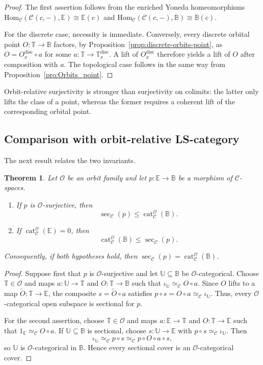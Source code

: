 \documentclass[12pt]{amsart}
\newtheorem{thm}[teo]{Theorem}
\theoremstyle{definition}
\theoremstyle{remark}
\numberwithin{figure}{section}%
\newcommand{\CC}{\mathcal{C}}
\newcommand{\cat}{\mathop{\mathrm{cat}}}
\newcommand{\T}{\mathbb{T}}
\newcommand{\Hom}{\mathrm{Hom}}
\newcommand{\Ee}{\mathbb{E}}
\newcommand{\Bb}{\mathbb{B}}
\newcommand{\Uu}{\mathbb{U}}
\begin{document}
\begin{proof}
The first assertion follows from the enriched Yoneda homeomorphisms
$\Hom_{\CC}(\CC(c,-),\Ee)\cong\Ee(c)$ and
$\Hom_{\CC}(\CC(c,-),\Bb)\cong\Bb(c)$.

For the discrete case, necessity is immediate. Conversely, every
discrete orbital point $O\colon\T\to\Bb$ factors, by
Proposition~\ref{prop:discrete-orbits-point}, as
$O=O_x^{\mathrm{disc}}\circ a$ for some
$a\colon\T\to\T_x^{\mathrm{disc}}$. A lift of
$O_x^{\mathrm{disc}}$ therefore yields a lift of $O$ after composition
with $a$. The topological case follows in the same way from
Proposition~\ref{pro:Orbits_point}.
\end{proof}

Orbit-relative surjectivity is stronger than surjectivity on colimits:
the latter only lifts the class of a point, whereas the former requires a
coherent lift of the corresponding orbital point.

\subsection{Comparison with orbit-relative LS-category}

The next result relates the two invariants.

\begin{thm}
\label{prop:surjective-LS-category}
\label{prop:category-less-than-sectional}
\label{cor:sectional-equals-category}
Let $\mathcal O$ be an orbit family and let
$p\colon\Ee\to\Bb$ be a morphism of $\CC$-spaces.
\begin{enumerate}
    \item If $p$ is $\mathcal O$-surjective, then
    \[
    \sec_{\CC}(p)\leq\cat_{\CC}^{\mathcal O}(\Bb).
    \]

    \item If $\cat_{\CC}^{\mathcal O}(\Ee)=0$, then
    \[
    \cat_{\CC}^{\mathcal O}(\Bb)\leq\sec_{\CC}(p).
    \]
\end{enumerate}
Consequently, if both hypotheses hold, then
$\sec_{\CC}(p)=\cat_{\CC}^{\mathcal O}(\Bb)$.
\end{thm}

\begin{proof}
Suppose first that $p$ is $\mathcal O$-surjective and let
$\Uu\subseteq\Bb$ be $\mathcal O$-categorical. Choose
$\T\in\mathcal O$ and maps $a\colon\Uu\to\T$ and
$O\colon\T\to\Bb$ such that
$\iota_{\Uu}\simeq_{\CC}O\circ a$. Since $O$ lifts to a map
$\widetilde O\colon\T\to\Ee$, the composite
$s=\widetilde O\circ a$ satisfies
$p\circ s=O\circ a\simeq_{\CC}\iota_{\Uu}$. Thus, every
$\mathcal O$-categorical open subspace is sectional for $p$.

For the second assertion, choose $\T\in\mathcal O$ and maps
$a\colon\Ee\to\T$ and $O\colon\T\to\Ee$ such that
$1_{\Ee}\simeq_{\CC}O\circ a$. If $\Uu\subseteq\Bb$ is sectional,
choose $s\colon\Uu\to\Ee$ with
$p\circ s\simeq_{\CC}\iota_{\Uu}$. Then
\[
\iota_{\Uu}
\simeq_{\CC}
p\circ s
\simeq_{\CC}
p\circ O\circ a\circ s,
\]
so $\Uu$ is $\mathcal O$-categorical in $\Bb$. Hence every sectional
cover is an $\mathcal O$-categorical cover.
\end{proof}
\end{document}
